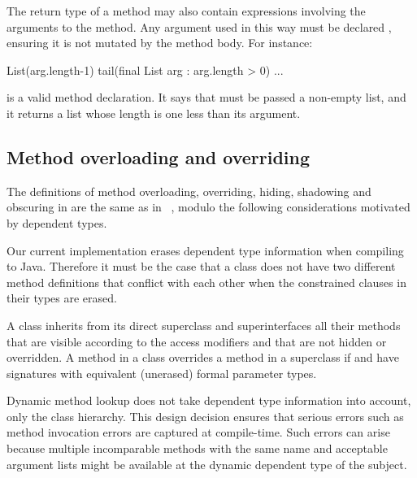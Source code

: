 The
return type of a method may also contain expressions involving the
arguments to the method.  Any argument used in this way must
be declared ,
ensuring it is not mutated by the method body.  For instance:
\begin{displayxten}
  List(arg.length-1) tail(final List arg : arg.length > 0) {...}
\end{displayxten}
\noindent is a valid method declaration. It says that
 must be passed a non-empty list, and it returns a list
whose length is one less than its argument.

\subsection{Method overloading and overriding}

The definitions of method overloading, overriding, hiding,
shadowing and obscuring in \Xten{} are the same as in
\Java~\cite{Java3}, modulo the following considerations
motivated by dependent types.

Our current implementation
erases dependent type information when compiling to Java. Therefore it
must be the case that a class does not have two different method
definitions that conflict with each other when the constrained
clauses in their types are erased.

A class  inherits from its direct superclass and
superinterfaces all their methods that are visible according to the access
modifiers and that are not hidden or overridden. A method
 in a class  overrides a method  in a
superclass  if  and  have signatures
with equivalent (unerased) formal parameter types. 

Dynamic method lookup does not take dependent type information into
account, only the class hierarchy. This design decision ensures that
serious errors such as method invocation errors are captured at
compile-time. Such errors can arise because multiple incomparable
methods with the same name and acceptable argument lists might be
available at the dynamic dependent type of the subject.


